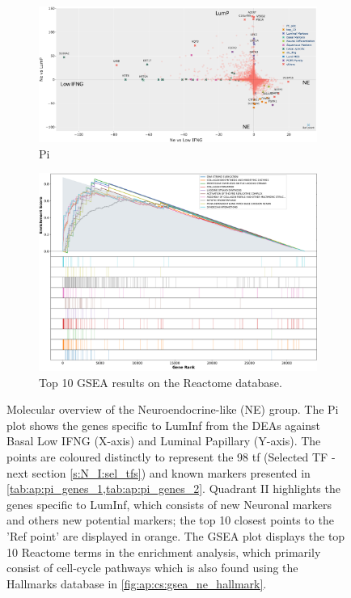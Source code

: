 \begin{figure}[!htb]
    \centering
    \captionsetup{font=small} 
    \begin{subfigure}[!t]{1.0\textwidth}
        \includegraphics[width=\textwidth,keepaspectratio]{Sections/ClusteringAnalysis/Resources/discussion/other_groups/ne_pi.png}    
        \caption{Pi}
        \label{fig:cs:ne_pi}
    \end{subfigure}
    \centering
    \begin{subfigure}[!t]{0.9\textwidth}
        \includegraphics[width=\textwidth, keepaspectratio]{Sections/ClusteringAnalysis/Resources/discussion/other_groups/ne2_reactome_10_top.png}
        \caption{Top 10 GSEA results on the Reactome database.}
        \label{fig:cs:ne_gsea}
    \end{subfigure} 
    \centering
    \caption[Ne-like - molecular overview]{Molecular overview of the Neuroendocrine-like (NE) group. The Pi plot shows the genes specific to LumInf from the DEAs against Basal Low IFNG (X-axis) and Luminal Papillary (Y-axis). The points are coloured distinctly to represent the 98 \acrlong{tf} (Selected TF - next section \cref{s:N_I:sel_tfs}) and known markers presented in \cref{tab:ap:pi_genes_1,tab:ap:pi_genes_2}. Quadrant II highlights the genes specific to LumInf, which consists of new Neuronal markers and others new potential markers; the top 10 closest points to the 'Ref point' are displayed in orange. The GSEA plot displays the top 10 Reactome terms in the enrichment analysis, which primarily consist of cell-cycle pathways which is also found using the Hallmarks database in \cref{fig:ap:cs:gsea_ne_hallmark}.}
    \label{fig:cs:ne}
\end{figure}




